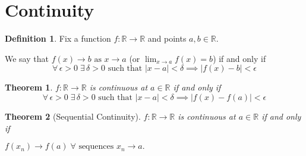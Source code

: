 \documentclass[11pt,a4paper]{article}
\newcommand\R{\mathbb{R}}
\newcommand\st{\text{ such that }}
\newtheorem{theorem}{Theorem}
\theoremstyle{definition}
\newtheorem{definition}{Definition}
\begin{document}
\section{Continuity} 

\begin{definition}
    Fix a function $ f: \R \to \R $ and points $ a, b \in \R $.
    
    We say that $ f(x) \to b \text{ as } x \to a $ (or $ \lim_{x \to a} f(x) = b $) if and only if
    \[ \forall \, \epsilon > 0 \; \exists \, \delta > 0 \st |x - a| < \delta \implies |f(x) - b| < \epsilon\]
\end{definition}

\begin{theorem}
    $ f : \R \to \R $ is continuous at $ a \in \R $ if and only if 
    \[ \forall \, \epsilon > 0 \; \exists \, \delta > 0 \st |x - a| < \delta \implies |f(x) - f(a)| < \epsilon\]
\end{theorem}

\begin{theorem}[Sequential Continuity]
   $ f : \R \to \R $ is continuous at $ a \in \R $ if and only if  
   
   $ f(x_n) \to f(a) \; \forall \text{ sequences } x_n \to a.$ 
\end{theorem}
\end{document}
